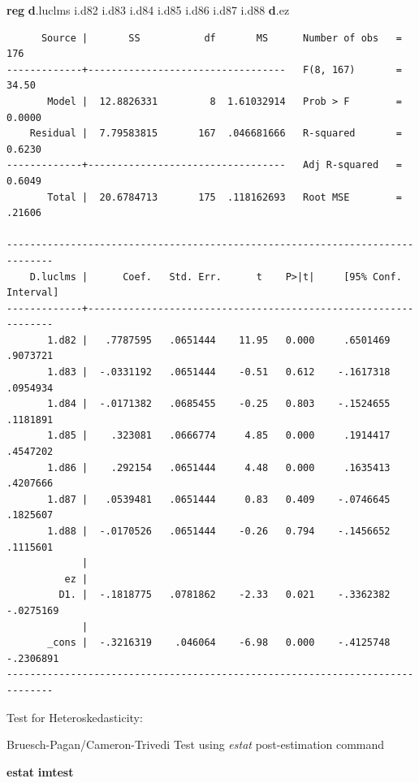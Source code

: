 \documentclass[
]{book}
\newenvironment{Shaded}{\begin{snugshade}}{\end{snugshade}}
\newcommand{\KeywordTok}[1]{\textcolor[rgb]{0.13,0.29,0.53}{\textbf{#1}}}
\newcommand{\NormalTok}[1]{#1}
\begin{document}
\begin{Shaded}
\begin{Highlighting}[]
\KeywordTok{reg} \KeywordTok{d}\NormalTok{.luclms i.d82 i.d83 i.d84 i.d85 i.d86 i.d87 i.d88 }\KeywordTok{d}\NormalTok{.ez}
\end{Highlighting}
\end{Shaded}

\begin{verbatim}
      Source |       SS           df       MS      Number of obs   =       176
-------------+----------------------------------   F(8, 167)       =     34.50
       Model |  12.8826331         8  1.61032914   Prob > F        =    0.0000
    Residual |  7.79583815       167  .046681666   R-squared       =    0.6230
-------------+----------------------------------   Adj R-squared   =    0.6049
       Total |  20.6784713       175  .118162693   Root MSE        =    .21606

------------------------------------------------------------------------------
    D.luclms |      Coef.   Std. Err.      t    P>|t|     [95% Conf. Interval]
-------------+----------------------------------------------------------------
       1.d82 |   .7787595   .0651444    11.95   0.000     .6501469    .9073721
       1.d83 |  -.0331192   .0651444    -0.51   0.612    -.1617318    .0954934
       1.d84 |  -.0171382   .0685455    -0.25   0.803    -.1524655    .1181891
       1.d85 |    .323081   .0666774     4.85   0.000     .1914417    .4547202
       1.d86 |    .292154   .0651444     4.48   0.000     .1635413    .4207666
       1.d87 |   .0539481   .0651444     0.83   0.409    -.0746645    .1825607
       1.d88 |  -.0170526   .0651444    -0.26   0.794    -.1456652    .1115601
             |
          ez |
         D1. |  -.1818775   .0781862    -2.33   0.021    -.3362382   -.0275169
             |
       _cons |  -.3216319    .046064    -6.98   0.000    -.4125748   -.2306891
------------------------------------------------------------------------------
\end{verbatim}

Test for Heteroskedasticity:

Bruesch-Pagan/Cameron-Trivedi Test using \emph{estat} post-estimation command

\begin{Shaded}
\begin{Highlighting}[]
\KeywordTok{estat} \KeywordTok{imtest}
\end{Highlighting}
\end{Shaded}
\end{document}
